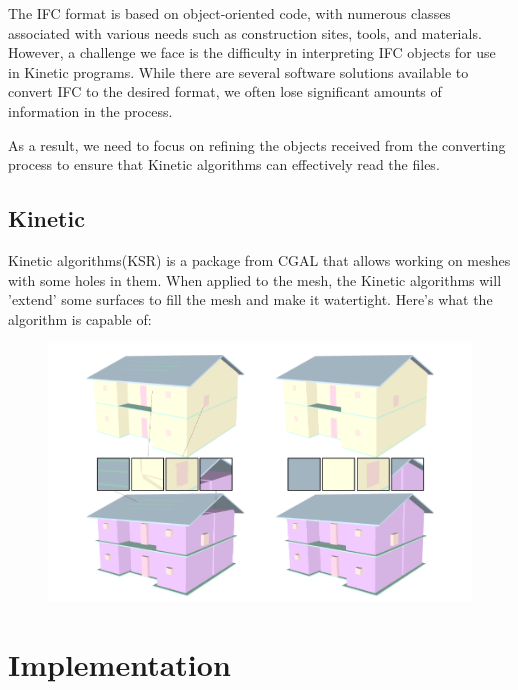 \documentclass{article}
\begin{document}
The IFC format is based on object-oriented code, with numerous classes associated with various needs such as construction sites, tools, and materials.
However, a challenge we face is the difficulty in interpreting IFC objects for use in Kinetic programs. While there are several software solutions available to convert IFC to the desired format, 
we often lose significant amounts of information in the process.

As a result, we need to focus on refining the objects received from the converting process to ensure that Kinetic algorithms can effectively read the files.

\subsection{Kinetic}

Kinetic algorithms(KSR) is a package from CGAL that allows working on meshes with 
some holes in them. When applied to the mesh, the Kinetic algorithms will 'extend' some surfaces to fill the mesh and make it watertight. 
Here's what the algorithm is capable of:


\begin{figure}[H]
    
\includegraphics[scale =   0.3 ]{../../images/example_algorithm.png}

\end{figure}


\section{Implementation}
\end{document}
